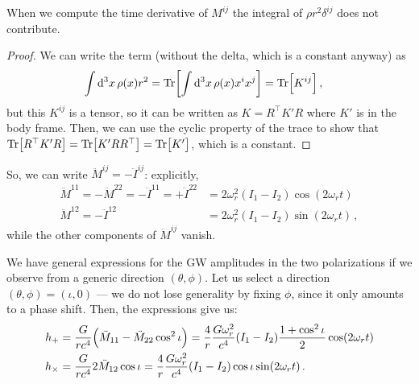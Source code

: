 \documentclass[main.tex]{subfiles}
\begin{document}
\begin{claim}
When we compute the time derivative of \(M^{ij}\) the integral of \(\rho r^2 \delta^{ij}\) does not contribute.
\end{claim}

\begin{proof}
We can write the term (without the delta, which is a constant anyway) as 
%
\begin{align}
\int \dd[3]{x} \rho (x) r^2  &=
\Tr[ \int \dd[3]{x} \rho (x) x^{i}x^{j}] = \Tr[K^{ij}]
\,,
\end{align}
%
but this \(K^{ij}\) is a tensor, so it can be written as \(K = R^{\top} K' R\) where \(K'\) is in the body frame. 
Then, we can use the cyclic property of the trace to show that \(\Tr[R^{\top} K' R] = \Tr[K' R R^{\top}] = \Tr[K']\), which is a constant.
\end{proof}

So, we can write \(\ddot{M}^{ij} = - \ddot{I}^{ij}\): explicitly, 
%
\begin{align}
\ddot{M}^{11}= - \ddot{M}^{22} = - \ddot{I}^{11} = + \ddot{I}^{22} 
&= 2 \omega_{r}^2 (I_1 - I_2 ) \cos(2 \omega_{r} t)   \\
\ddot{M}^{12} = - \ddot{I}^{12} 
&= 2 \omega_{r}^2 (I_1 - I_2 ) \sin(2 \omega_{r} t)
\,,
\end{align}
%
while the other components of \(\ddot{M}^{ij}\) vanish. 

We have general expressions for the GW amplitudes in the two polarizations if we observe from a generic direction \((\theta, \phi )\). Let us select a direction \((\theta, \phi ) = (\iota , 0)\) --- we do not lose generality by fixing \(\phi \), since it only amounts to a phase shift.
Then, the expressions give us: 
%
\begin{align}
h_{+} &= \frac{G}{rc^{4}} \qty(\ddot{M}_{11} - \ddot{M}_{22} \cos^2 \iota ) = \frac{4}{r}  \frac{G \omega_{r}^2}{c^{4}} (I_1 - I_2 ) \frac{1 + \cos^2\iota }{2}  \cos(2 \omega_{r}t )   \\
h_{ \times } &= \frac{G}{rc^{4}} 2 \ddot{M}_{12} \cos \iota 
= \frac{4}{r} \frac{G \omega_{r}^2}{c^{4}} (I_1 - I_2 ) \cos \iota \sin(2 \omega_{r} t)
\,.
\end{align}
\end{document}
